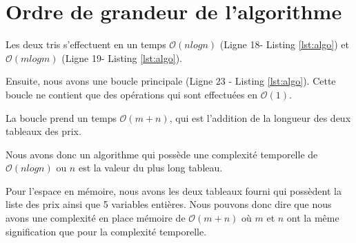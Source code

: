 \documentclass[11pt]{article}
\begin{document}
\section{Ordre de grandeur de l'algorithme}

Les deux tris s'effectuent en un temps $\mathcal{O}(n log{n})$ (Ligne 18- Listing \ref{lst:algo}) et $\mathcal{O}(m log{m})$ (Ligne 19- Listing \ref{lst:algo}).

Ensuite, nous avons une boucle principale (Ligne 23 - Listing \ref{lst:algo}). Cette boucle ne contient que des opérations qui sont effectuées en $\mathcal{O}(1)$.

La boucle prend un temps $\mathcal{O}(m + n)$, qui est l'addition de la longueur des deux tableaux des prix.

Nous avons donc un algorithme qui possède une complexité temporelle de $\mathcal{O}(n log n)$ ou $n$ est la valeur du plus long tableau.

Pour l'espace en mémoire, nous avons les deux tableaux fourni qui possèdent la liste des prix ainsi que 5 variables entières.
Nous pouvons donc dire que nous avons une complexité en place mémoire de  $\mathcal{O}(m + n)$ où $m$ et $n$ ont la même signification que pour la complexité temporelle.
\end{document}
